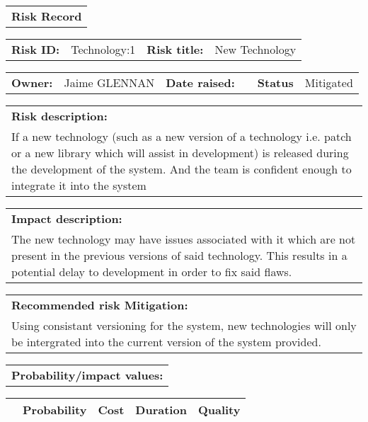 \begin{table}%
	\begin{tabularx}{\textwidth}{| X |}
		\hline
		\textbf{Risk Record} \\
	\end{tabularx}
	\begin{tabularx}{\textwidth}{| l | X | l | X |}
		\hline
		\textbf{Risk ID:} & Technology:1 & \textbf{Risk title:} & New Technology  \\
	\end{tabularx}
	\begin{tabularx}{\textwidth}{| l | X | l | X | l | X |}
		\hline
		\textbf{Owner:} & Jaime GLENNAN & \textbf{Date raised:} &  & \textbf{Status} & Mitigated \\
	\end{tabularx}
	\begin{tabularx}{\textwidth}{| X |}
		\hline
		\textbf{Risk description:} \\ If a new technology (such as a new version of a technology i.e. patch or a new library which will assist in development) is released during the development of the system. And the team is confident enough to integrate it into the system   \\
	\end{tabularx}
	\begin{tabularx}{\textwidth}{| X |}
		\hline
		\textbf{Impact description:} \\ The new technology may have issues associated with it which are not present in the previous versions of said technology. This results in a potential delay to development in order to fix said flaws.\\
	\end{tabularx}
	\begin{tabularx}{\textwidth}{| X |}
		\hline
		\textbf{Recommended risk Mitigation:} \\ Using consistant versioning for the system, new technologies will only be intergrated into the current version of the system provided. \\
	\end{tabularx}
	\begin{tabularx}{\textwidth}{| X |}
		\hline
		\textbf{Probability/impact values:} \\
	\end{tabularx}
	\begin{tabularx}{\textwidth}{| l | l | X | X | X |}
		\hline
		 &  \textbf{Probability} & \textbf{Cost} & \textbf{Duration} & \textbf{Quality} \\ \hline

\end{tabularx}
\end{table}
